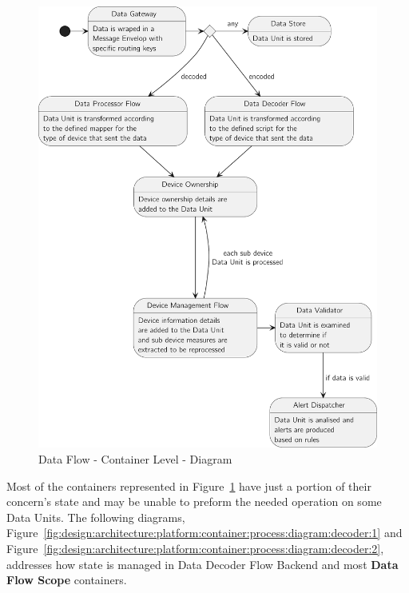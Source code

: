 \begin{figure}[H]
   \centering
   \includegraphics[page=1,width=0.8\columnwidth]{assets/diagrams/design/architectural/level2/process/data-flow-scope.pdf}
   \caption[Data Flow - Container Level - Diagram]{Data Flow - Container Level - Diagram}
   \label{fig:design:architecture:platform:container:process:diagram:flow}
\end{figure}

Most of the containers represented in Figure~\ref{fig:design:architecture:platform:container:process:diagram:flow} have just a portion of their concern's state and may be unable to preform the needed operation on some Data Units. The following diagrams, Figure~\ref{fig:design:architecture:platform:container:process:diagram:decoder:1} and Figure~\ref{fig:design:architecture:platform:container:process:diagram:decoder:2}, addresses how state is managed in Data Decoder Flow Backend and most \textbf{Data Flow Scope} containers.

